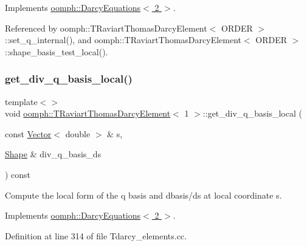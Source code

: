 Implements \hyperlink{classoomph_1_1DarcyEquations_ad1d3676060924184befea1157a0735cd}{oomph\+::\+Darcy\+Equations$<$ 2 $>$}.



Referenced by oomph\+::\+T\+Raviart\+Thomas\+Darcy\+Element$<$ O\+R\+D\+E\+R $>$\+::set\+\_\+q\+\_\+internal(), and oomph\+::\+T\+Raviart\+Thomas\+Darcy\+Element$<$ O\+R\+D\+E\+R $>$\+::shape\+\_\+basis\+\_\+test\+\_\+local().

\mbox{\label{classoomph_1_1TRaviartThomasDarcyElement_a054174561fc65ac0406c6e18fb2d0daa}} 
\subsubsection{\texorpdfstring{get\+\_\+div\+\_\+q\+\_\+basis\+\_\+local()}{get\_div\_q\_basis\_local()}\hspace{0.1cm}{\footnotesize\ttfamily [3/3]}}
{\footnotesize\ttfamily template$<$$>$ \\
void \hyperlink{classoomph_1_1TRaviartThomasDarcyElement}{oomph\+::\+T\+Raviart\+Thomas\+Darcy\+Element}$<$ 1 $>$\+::get\+\_\+div\+\_\+q\+\_\+basis\+\_\+local (\begin{DoxyParamCaption}\item[{const \hyperlink{classoomph_1_1Vector}{Vector}$<$ double $>$ \&}]{s,  }\item[{\hyperlink{classoomph_1_1Shape}{Shape} \&}]{div\+\_\+q\+\_\+basis\+\_\+ds }\end{DoxyParamCaption}) const\hspace{0.3cm}{\ttfamily [virtual]}}



Compute the local form of the q basis and dbasis/ds at local coordinate s. 



Implements \hyperlink{classoomph_1_1DarcyEquations_ad1d3676060924184befea1157a0735cd}{oomph\+::\+Darcy\+Equations$<$ 2 $>$}.



Definition at line 314 of file Tdarcy\+\_\+elements.\+cc.



